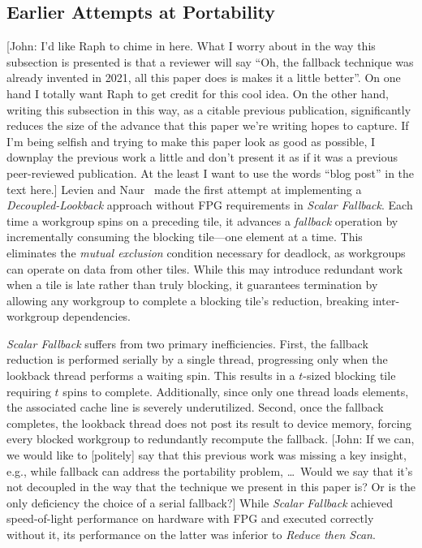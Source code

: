 \documentclass[sigconf]{acmart}
\newcommand{\john}[1]{{\footnotesize\color{cyan}[John: #1]}}
\begin{document}
\subsection{Earlier Attempts at Portability}
\john{I'd like Raph to chime in here. What I worry about in the way this subsection is presented is that a reviewer will say ``Oh, the fallback technique was already invented in 2021, all this paper does is makes it a little better''. On one hand I totally want Raph to get credit for this cool idea. On the other hand, writing this subsection in this way, as a citable previous publication, significantly reduces the size of the advance that this paper we're writing hopes to capture. If I'm being selfish and trying to make this paper look as good as possible, I downplay the previous work a little and don't present it as if it was a previous peer-reviewed publication. At the least I want to use the words ``blog post'' in the text here.}
Levien and Naur~\cite{Raph2021} made the first attempt at implementing a \emph{Decoupled-Lookback} approach without FPG requirements in \emph{Scalar Fallback}. Each time a workgroup spins on a preceding tile, it advances a \emph{fallback} operation by incrementally consuming the blocking tile---one element at a time. This eliminates the \emph{mutual exclusion} condition necessary for deadlock, as workgroups can operate on data from other tiles. While this may introduce redundant work when a tile is late rather than truly blocking, it guarantees termination by allowing any workgroup to complete a blocking tile’s reduction, breaking inter-workgroup dependencies.

\emph{Scalar Fallback} suffers from two primary inefficiencies. First, the fallback reduction is performed serially by a single thread, progressing only when the lookback thread performs a waiting spin. This results in a $t$-sized blocking tile requiring $t$ spins to complete. Additionally, since only one thread loads elements, the associated cache line is severely underutilized. Second, once the fallback completes, the lookback thread does not post its result to device memory, forcing every blocked workgroup to redundantly recompute the fallback. \john{If we can, we would like to [politely] say that this previous work was missing a key insight, e.g., while fallback can address the portability problem, \ldots\ Would we say that it's not decoupled in the way that the technique we present in this paper is? Or is the only deficiency the choice of a serial fallback?} While \emph{Scalar Fallback} achieved speed-of-light performance on hardware with FPG and executed correctly without it, its performance on the latter was inferior to \emph{Reduce then Scan}.
\end{document}
